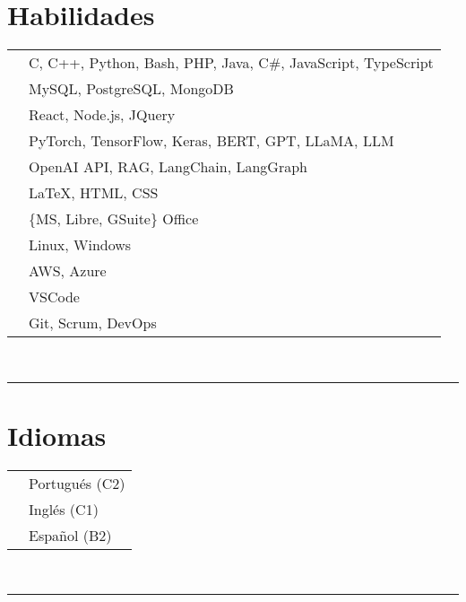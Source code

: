 \documentclass[oneside]{article}
\begin{document}
{\begin{minipage}[t][\textheight-2\fboxsep-2\fboxrule][t]{\dimexpr0.40\textwidth-2\fboxrule-2\fboxsep\relax}
        \section*{\large Habilidades}
        \begin{tabularx}{\textwidth}{cY}
\faCode{}             & C, C++, Python, Bash, PHP, Java, C\#, JavaScript, TypeScript \\
            \faDatabase{}         & MySQL, PostgreSQL, MongoDB \\
            \faProjectDiagram{}   & React, Node.js, JQuery \\
            \faBrain{}            & PyTorch, TensorFlow, Keras, BERT, GPT, LLaMA, LLM \\
            \faNetworkWired{}     & OpenAI API, RAG, LangChain, LangGraph \\
            \faPenNib{}           & \LaTeX, HTML, CSS \\
            \faFont{}             & \{MS, Libre, GSuite\} Office \\
            \faCogs{}             & Linux, Windows \\
            \faCloud{}            & AWS, Azure \\
            \faLaptopCode{}       & VSCode \\
            \faTools{}            & Git, Scrum, DevOps \\
        \end{tabularx}
        \vspace{1pt} \\ 
        \rule{\linewidth}{0.4pt}
        \section*{\large Idiomas}
        \begin{tabular}{cl}
            \faLanguage{} & Portugués (C2) \\ 
            \faLanguage{} & Inglés (C1) \\ 
            \faLanguage{} & Español (B2) 
        \end{tabular}
        \vspace{.3cm} 
        \\ 
        \rule{\linewidth}{0.4pt} 
        \\

    \end{minipage}
}
\end{document}
